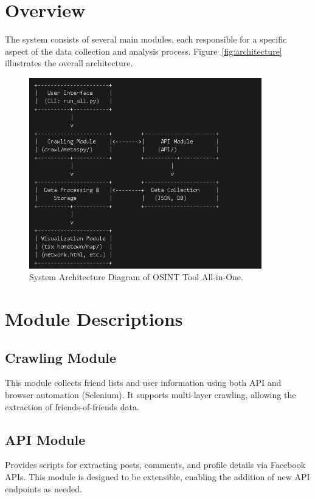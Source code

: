 \documentclass[13pt,a4paper]{report}
\begin{document}
\section{Overview}
The system consists of several main modules, each responsible for a specific aspect of the data collection and analysis process. Figure~\ref{fig:architecture} illustrates the overall architecture.

\begin{figure}[h!]
    \centering
    \includegraphics[width=0.9\textwidth]{architecture_diagram.png}
    \caption{System Architecture Diagram of OSINT Tool All-in-One.}
\end{figure}

\section{Module Descriptions}
\subsection{Crawling Module}
This module collects friend lists and user information using both API and browser automation (Selenium). It supports multi-layer crawling, allowing the extraction of friends-of-friends data.

\subsection{API Module}
Provides scripts for extracting posts, comments, and profile details via Facebook APIs. This module is designed to be extensible, enabling the addition of new API endpoints as needed.
\end{document}
